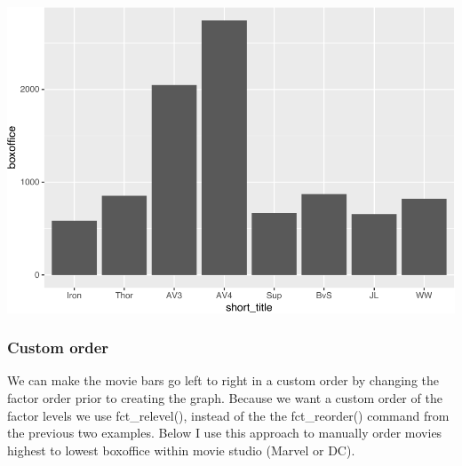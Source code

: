 \documentclass[
]{krantz}
\makeatletter
\newenvironment{Shaded}{\begin{snugshade}}{\end{snugshade}}
\newcommand{\DataTypeTok}[1]{\textcolor[rgb]{0.27,0.27,0.27}{#1}}
\newcommand{\KeywordTok}[1]{\textcolor[rgb]{0.27,0.27,0.27}{\textbf{#1}}}
\newcommand{\NormalTok}[1]{#1}
\newcommand{\OperatorTok}[1]{\textcolor[rgb]{0.43,0.43,0.43}{\textbf{#1}}}
\newcommand{\StringTok}[1]{\textcolor[rgb]{0.5,0.5,0.5}{#1}}
\newenvironment{kframe}{%
\medskip{}
\setlength{\fboxsep}{.8em}
 \def\at@end@of@kframe{}%
 \ifinner\ifhmode%
  \def\at@end@of@kframe{\end{minipage}}%
  \begin{minipage}{\columnwidth}%
 \fi\fi%
 \def\FrameCommand##1{\hskip\@totalleftmargin \hskip-\fboxsep
 \colorbox{shadecolor}{##1}\hskip-\fboxsep
     \hskip-\linewidth \hskip-\@totalleftmargin \hskip\columnwidth}%
 \MakeFramed {\advance\hsize-\width
   \@totalleftmargin\z@ \linewidth\hsize
   \@setminipage}}%
 {\par\unskip\endMakeFramed%
 \at@end@of@kframe}
\renewenvironment{Shaded}{\begin{kframe}}{\end{kframe}}
\makeatother
\begin{document}
\includegraphics{bookdown_files/figure-latex/unnamed-chunk-259-1.pdf}

\hypertarget{custom-order}{%
\subsubsection{Custom order}\label{custom-order}}

We can make the movie bars go left to right in a custom order by changing the factor order prior to creating the graph. Because we want a custom order of the factor levels we use fct\_relevel(), instead of the the fct\_reorder() command from the previous two examples. Below I use this approach to manually order movies highest to lowest boxoffice within movie studio (Marvel or DC).

\begin{Shaded}
\end{Shaded}
\end{document}
